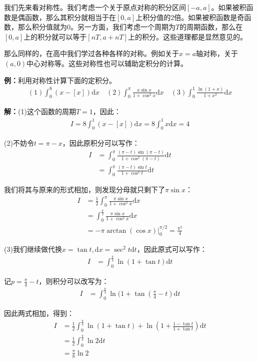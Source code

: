 \documentclass{ctexart}
\let\oldtextbf\textbf %
\renewcommand{\textbf}[1]{\textcolor{btex}{\oldtextbf{#1}}} %
\begin{document}
我们先来看对称性。我们考虑一个关于原点对称的积分区间$[-a,a]$。如果被积函数是偶函数，那么其积分就相当于在$[0,a]$上积分值的2倍。如果被积函数是奇函数，那么积分值就为0。另一方面，我们考虑一个周期为$T$的周期函数，那么在$[0,a]$上的积分就可以等于$[nT,a+nT]$上的积分。这些道理都是显然意见的。

那么同样的，在高中我们学过各种各样的对称。例如关于$x=a$轴对称，关于$(a,0)$中心对称等。这些对称性也可以辅助定积分的计算。

\textbf{例：}利用对称性计算下面的定积分。
\begin{align*}
    (1)\int_0^8 (x-[x])\mathrm{d}x\quad (2)\int_0^\pi \frac{x\sin x}{1+\cos^2 x}\mathrm{d}x\quad (3)\int_0^1\frac{\ln(1+x)}{1+x^2}\mathrm{d}x
\end{align*}

\textbf{解：}(1)这个函数的周期$T=1$，因此：
\begin{align*}
    I=8\int_0^1 (x-[x])\mathrm{d}x=8\int_0^1x\mathrm{d}x=4
\end{align*}

(2)不妨令$t=\pi-x$，因此原积分可以写作：
\begin{align*}
    I&=\int_0^\pi \frac{(\pi-t)\sin(\pi-t)}{1+\cos^2(\pi-t)}\mathrm{d}t\\
    &=\int_0^\pi \frac{(\pi-t)\sin t}{1+\cos^2 t}\mathrm{d}t
\end{align*}

我们将其与原来的形式相加，则发现分母就只剩下了$\pi \sin x$：
\begin{align*}
    I&=\frac{1}{2}\int_0^\pi \frac{\pi\sin x}{1+\cos^2 x}\mathrm{d}x\\
    &=\int_0^\frac{\pi}{2} \frac{\pi\sin x}{1+\cos^2 x}\mathrm{d}x\\
    &=-\pi\arctan(\cos x)|_0^{\pi/2}=\frac{\pi^2}{4}
\end{align*}

(3)我们继续做代换$x=\tan t,\mathrm{d}x=\sec^2 t\mathrm{d}t$，因此原式可以写作：
\begin{align*}
    I&=\int_0^\frac{\pi}{4}\ln(1+\tan t)\mathrm{d}t
\end{align*}

记$p=\frac{\pi}{4}-t$，则积分可以改写为：
\begin{align*}
    I&=\int_0^\frac{\pi}{4}\ln(1+\tan(\frac{\pi}{4}-t)\mathrm{d}t
\end{align*}

因此两式相加，得到：
\begin{align*}
    I&=\frac{1}{2}\int_0^\frac{\pi}{4}\ln(1+\tan t)+\ln(1+\frac{1-\tan t}{1+\tan t})\mathrm{d}t\\
    &=\frac{1}{2}\int_0^\frac{\pi}{4}\ln 2\mathrm{d}t\\
    &=\frac{\pi}{8}\ln 2
\end{align*}
\end{document}
